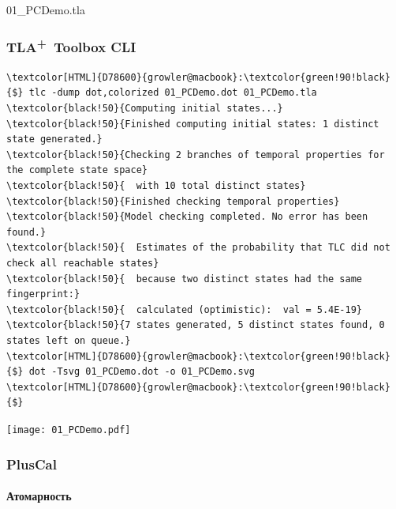 \documentclass[
  11pt,aspectratio=169,pdf,hyperref={unicode,colorlinks=false}
]{beamer}
\def\TLA{TLA\textsuperscript{+}}
\begin{document}
\begin{frame}[c]
  \\[2ex]%
  {\normalsize\ttfamily\textcolor{black!80}{01\_PCDemo.tla}}
\end{frame}

\begin{frame}[c,fragile]
  \frametitle{\TLA\ Toolbox CLI}
  \begin{tcolorbox}[colback=shellbgcolor,boxrule=.25pt]%
    \scriptsize%
    \begin{Verbatim}[commandchars=\\\{\}]
\textcolor[HTML]{D78600}{growler@macbook}:\textcolor{green!90!black}{$} tlc -dump dot,colorized 01_PCDemo.dot 01_PCDemo.tla
\textcolor{black!50}{Computing initial states...}
\textcolor{black!50}{Finished computing initial states: 1 distinct state generated.}
\textcolor{black!50}{Checking 2 branches of temporal properties for the complete state space}
\textcolor{black!50}{  with 10 total distinct states}
\textcolor{black!50}{Finished checking temporal properties}
\textcolor{black!50}{Model checking completed. No error has been found.}
\textcolor{black!50}{  Estimates of the probability that TLC did not check all reachable states}
\textcolor{black!50}{  because two distinct states had the same fingerprint:}
\textcolor{black!50}{  calculated (optimistic):  val = 5.4E-19}
\textcolor{black!50}{7 states generated, 5 distinct states found, 0 states left on queue.}
\textcolor[HTML]{D78600}{growler@macbook}:\textcolor{green!90!black}{$} dot -Tsvg 01_PCDemo.dot -o 01_PCDemo.svg
\textcolor[HTML]{D78600}{growler@macbook}:\textcolor{green!90!black}{$}
    \end{Verbatim}
  \end{tcolorbox}
\end{frame}

\begin{frame}[c]
  \begin{center}
    \texttt{[image: 01\_PCDemo.pdf]}%
  \end{center}
\end{frame}

\begin{frame}[c,fragile]
  \frametitle{PlusCal}
  \framesubtitle{Атомарность}
  \begin{columns}[T]
    \begin{column}{.45\textwidth}
    \end{column}
    \begin{column}{.45\textwidth}
    \end{column}
  \end{columns}
\end{frame}
\end{document}

